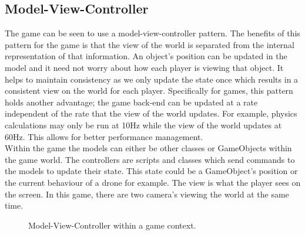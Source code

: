 \documentclass[11pt,a4paper]{article}
\begin{document}
\subsection{Model-View-Controller}
The game can be seen to use a model-view-controller pattern. The benefits of this pattern for the game is that the view of the world is separated from the internal representation of that information. An object's position can be updated in the model and it need not worry about how each player is viewing that object. It helps to maintain consistency as we only update the state once which results in a consistent view on the world for each player. Specifically for games, this pattern holds another advantage; the game back-end can be updated at a rate independent of the rate that the view of the world updates. For example, physics calculations may only be run at 10Hz while the view of the world updates at 60Hz. This allows for better performance management.\smallskip\\
Within the game the models can either be other classes or GameObjects within the game world. The controllers are scripts and classes which send commands to the models to update their state. This state could be a GameObject's position or the current behaviour of a drone for example. The view is what the player sees on the screen. In this game, there are two camera's viewing the world at the same time.
\begin{figure}[H]
    \caption{Model-View-Controller within a game context.}
    \label{fig:mvc}
\end{figure}
\end{document}
